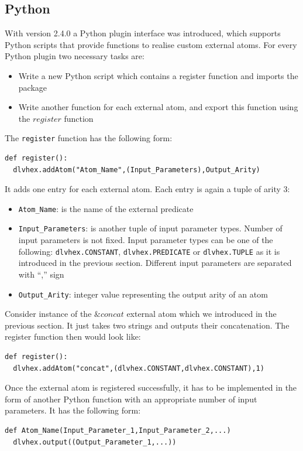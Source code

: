 \documentclass[14pt,a4paper, titlepage]{article}
\begin{document}
\subsection{Python}
With \dlvhex{} version 2.4.0 a Python plugin interface was 
introduced, which supports Python scripts that provide 
functions to realise custom external atoms. For every Python plugin two necessary tasks are:
\begin{itemize}
\item Write a new Python script which contains a register function and imports the package \dlvhex{}
\item Write another function for each external atom, and export this function using the $\mathit{register}$ function 
\end{itemize}
The \verb+register+ function has the following form:
\begin{verbatim} 
def register():
  dlvhex.addAtom("Atom_Name",(Input_Parameters),Output_Arity) 
\end{verbatim}
It adds one entry for each external atom. Each entry is 
again a tuple of arity 3:
\begin{itemize}
\item \verb+Atom_Name+: is the name of the 
external predicate
\item \verb+Input_Parameters+: is another 
tuple of input parameter types. Number of input parameters 
is not fixed. Input parameter types can be one of the 
following: \verb+dlvhex.CONSTANT+, \verb+dlvhex.PREDICATE+ or 
\verb+dlvhex.TUPLE+ as it is introduced in the previous section. Different input parameters are separated with  
``,'' sign   
\item \verb+Output_Arity+: integer value representing the output arity of an atom  
\end{itemize}
Consider instance of the $\mathit{\&concat}$ external atom which we introduced in the previous section. It just takes two strings and outputs their concatenation. The register function then would look like:
\begin{verbatim}
def register():
  dlvhex.addAtom("concat",(dlvhex.CONSTANT,dlvhex.CONSTANT),1)  
\end{verbatim}
Once the external atom is registered successfully, it has 
to be implemented in the form of another Python function 
with an appropriate number of input parameters. It has the 
following form:  
\begin{verbatim}
def Atom_Name(Input_Parameter_1,Input_Parameter_2,...)
  dlvhex.output((Output_Parameter_1,...))
\end{verbatim}
\end{document}
